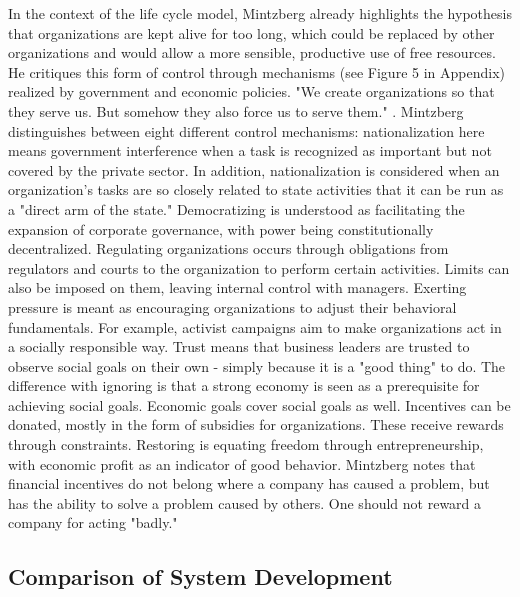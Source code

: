 \documentclass[a4paper,12pt]{article}
\begin{document}
In the context of the life cycle model, Mintzberg already highlights the
hypothesis that organizations are kept alive for too long, which could be
replaced by other organizations and would allow a more sensible, productive
use of free resources. He critiques this form of control through mechanisms
(see Figure 5 in Appendix) realized by government and economic policies. "We
create organizations so that they serve us. But somehow they also force us to
serve them." \cite[p. 307]{Mintzberg}. Mintzberg distinguishes between eight
different control mechanisms: nationalization here means government
interference when a task is recognized as important but not covered by the
private sector. In addition, nationalization is considered when an
organization's tasks are so closely related to state activities that it can be
run as a "direct arm of the state." Democratizing is understood as
facilitating the expansion of corporate governance, with power being
constitutionally decentralized. Regulating organizations occurs through
obligations from regulators and courts to the organization to perform certain
activities. Limits can also be imposed on them, leaving internal control with
managers. Exerting pressure is meant as encouraging organizations to adjust
their behavioral fundamentals. For example, activist campaigns aim to make
organizations act in a socially responsible way. Trust means that business
leaders are trusted to observe social goals on their own - simply because it
is a "good thing" to do. The difference with ignoring is that a strong economy
is seen as a prerequisite for achieving social goals. Economic goals cover
social goals as well. Incentives can be donated, mostly in the form of
subsidies for organizations. These receive rewards through
constraints. Restoring is equating freedom through entrepreneurship, with
economic profit as an indicator of good behavior. Mintzberg notes that
financial incentives do not belong where a company has caused a problem, but
has the ability to solve a problem caused by others. One should not reward a
company for acting "badly."

\subsection{Comparison of System Development}
\end{document}
